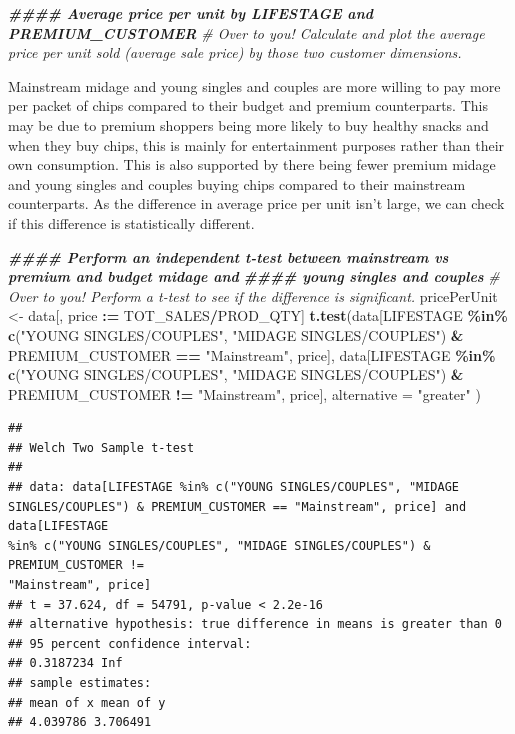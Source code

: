 \documentclass[
]{article}
\newenvironment{Shaded}{\begin{snugshade}}{\end{snugshade}}
\newcommand{\AttributeTok}[1]{\textcolor[rgb]{0.13,0.29,0.53}{#1}}
\newcommand{\CommentTok}[1]{\textcolor[rgb]{0.56,0.35,0.01}{\textit{#1}}}
\newcommand{\DocumentationTok}[1]{\textcolor[rgb]{0.56,0.35,0.01}{\textbf{\textit{#1}}}}
\newcommand{\FunctionTok}[1]{\textcolor[rgb]{0.13,0.29,0.53}{\textbf{#1}}}
\newcommand{\NormalTok}[1]{#1}
\newcommand{\OtherTok}[1]{\textcolor[rgb]{0.56,0.35,0.01}{#1}}
\newcommand{\SpecialCharTok}[1]{\textcolor[rgb]{0.81,0.36,0.00}{\textbf{#1}}}
\newcommand{\StringTok}[1]{\textcolor[rgb]{0.31,0.60,0.02}{#1}}
\begin{document}
\begin{Shaded}
\begin{Highlighting}[]
\DocumentationTok{\#\#\#\# Average price per unit by LIFESTAGE and PREMIUM\_CUSTOMER}
\CommentTok{\# Over to you! Calculate and plot the average price per unit sold (average sale price) by those two customer dimensions.}
\end{Highlighting}
\end{Shaded}

Mainstream midage and young singles and couples are more willing to pay
more per packet of chips compared to their budget and premium
counterparts. This may be due to premium shoppers being more likely to
buy healthy snacks and when they buy chips, this is mainly for
entertainment purposes rather than their own consumption. This is also
supported by there being fewer premium midage and young singles and
couples buying chips compared to their mainstream counterparts. As the
difference in average price per unit isn't large, we can check if this
difference is statistically different.

\begin{Shaded}
\begin{Highlighting}[]
\DocumentationTok{\#\#\#\# Perform an independent t{-}test between mainstream vs premium and budget midage and}
\DocumentationTok{\#\#\#\# young singles and couples}
\CommentTok{\# Over to you! Perform a t{-}test to see if the difference is significant.}
\NormalTok{pricePerUnit }\OtherTok{\textless{}{-}}\NormalTok{ data[, price }\SpecialCharTok{:=}\NormalTok{ TOT\_SALES}\SpecialCharTok{/}\NormalTok{PROD\_QTY]}
\FunctionTok{t.test}\NormalTok{(data[LIFESTAGE }\SpecialCharTok{\%in\%} \FunctionTok{c}\NormalTok{(}\StringTok{"YOUNG SINGLES/COUPLES"}\NormalTok{, }\StringTok{"MIDAGE SINGLES/COUPLES"}\NormalTok{) }\SpecialCharTok{\&}\NormalTok{ PREMIUM\_CUSTOMER }\SpecialCharTok{==} \StringTok{"Mainstream"}\NormalTok{, price], data[LIFESTAGE }\SpecialCharTok{\%in\%} \FunctionTok{c}\NormalTok{(}\StringTok{"YOUNG SINGLES/COUPLES"}\NormalTok{, }\StringTok{"MIDAGE SINGLES/COUPLES"}\NormalTok{) }\SpecialCharTok{\&}\NormalTok{ PREMIUM\_CUSTOMER }\SpecialCharTok{!=} \StringTok{"Mainstream"}\NormalTok{, price], }\AttributeTok{alternative =} \StringTok{"greater"}\NormalTok{ )}
\end{Highlighting}
\end{Shaded}

\begin{verbatim}
##
## Welch Two Sample t-test
##
## data: data[LIFESTAGE %in% c("YOUNG SINGLES/COUPLES", "MIDAGE
SINGLES/COUPLES") & PREMIUM_CUSTOMER == "Mainstream", price] and data[LIFESTAGE
%in% c("YOUNG SINGLES/COUPLES", "MIDAGE SINGLES/COUPLES") & PREMIUM_CUSTOMER !=
"Mainstream", price]
## t = 37.624, df = 54791, p-value < 2.2e-16
## alternative hypothesis: true difference in means is greater than 0
## 95 percent confidence interval:
## 0.3187234 Inf
## sample estimates:
## mean of x mean of y
## 4.039786 3.706491
\end{verbatim}
\end{document}
